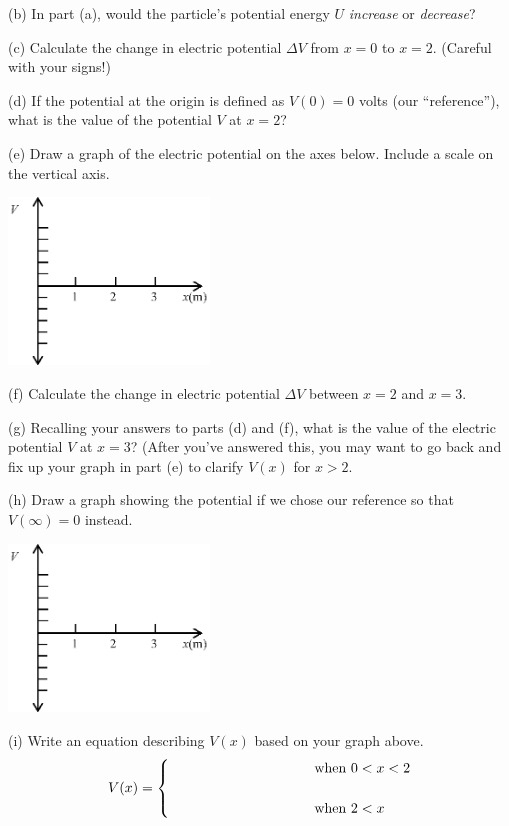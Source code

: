 (b) In part (a), would the particle's potential energy $U$ \textit{increase} or \textit{decrease}?
\answerspace{0.7in}

(c) Calculate the change in electric potential $\Delta V$ from $x=0$ to $x=2$. (Careful with your signs!)
\answerspace{0.9in}

(d) If the potential at the origin is defined as $V(0)=0$ volts (our ``reference''), what is the value of the potential $V$ at $x=2$?
\answerspace{0.7in}

\pagebreak
(e) Draw a graph of the electric potential on the axes below.  Include a scale on the vertical axis.
\begin{center}
\includegraphics[width=0.4\textwidth]{finding_v_from_e/fig2.eps}
\end{center}

(f) Calculate the change in electric potential $\Delta V$ between $x=2$ and $x=3$.
\answerspace{0.5in}

(g) Recalling your answers to parts (d) and (f), what is the value of the electric potential $V$ at $x=3$?  (After you've answered this, you may want to go back and fix up your graph in part (e) to clarify $V(x)$ for $x>2$.
\answerspace{0.5in}

(h) Draw a graph showing the potential if we chose our reference so that $V(\infty)=0$ instead.  
\begin{center}
\includegraphics[width=0.4\textwidth]{finding_v_from_e/fig2.eps}
\end{center}
(i) Write an equation describing $V(x)$ based on your graph above.
\begin{displaymath}
V(x) = \begin{cases}
        \rule{1.3in}{0in}  & \textrm{when } 0<x<2\\
        \\
        \hspace{1.3in} & \textrm{when }  2 < x
        \end{cases}
\end{displaymath}
\answerspace{0.1in}

